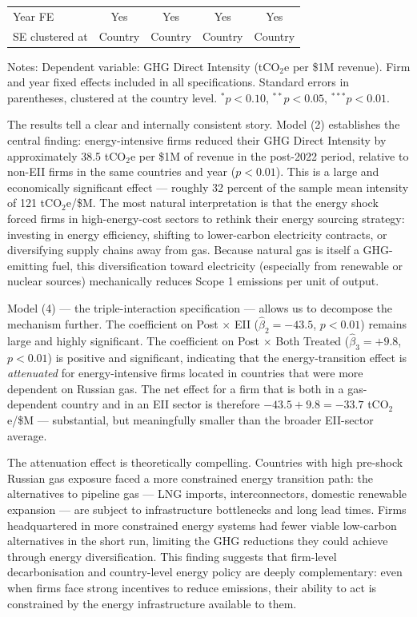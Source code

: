 \documentclass[12pt,a4paper]{article}
\begin{document}
\begin{table}[H]
\begin{tabular}{lcccc}
Year FE        & Yes     & Yes     & Yes     & Yes \\
SE clustered at & Country & Country & Country & Country \\
\bottomrule
\end{tabular}
\begin{tablenotes}
\small
\item Notes: Dependent variable: GHG Direct Intensity (tCO$_2$e per \$1M revenue). Firm and year fixed effects included in all specifications. Standard errors in parentheses, clustered at the country level. $^{*}p<0.10$, $^{**}p<0.05$, $^{***}p<0.01$.
\end{tablenotes}
\end{table}

The results tell a clear and internally consistent story. Model (2) establishes the central finding: energy-intensive firms reduced their GHG Direct Intensity by approximately 38.5 tCO$_2$e per \$1M of revenue in the post-2022 period, relative to non-EII firms in the same countries and year ($p < 0.01$). This is a large and economically significant effect — roughly 32 percent of the sample mean intensity of 121 tCO$_2$e/\$M. The most natural interpretation is that the energy shock forced firms in high-energy-cost sectors to rethink their energy sourcing strategy: investing in energy efficiency, shifting to lower-carbon electricity contracts, or diversifying supply chains away from gas. Because natural gas is itself a GHG-emitting fuel, this diversification toward electricity (especially from renewable or nuclear sources) mechanically reduces Scope 1 emissions per unit of output.

Model (4) — the triple-interaction specification — allows us to decompose the mechanism further. The coefficient on Post $\times$ EII ($\hat\beta_2 = -43.5$, $p<0.01$) remains large and highly significant. The coefficient on Post $\times$ Both Treated ($\hat\beta_3 = +9.8$, $p<0.01$) is positive and significant, indicating that the energy-transition effect is \textit{attenuated} for energy-intensive firms located in countries that were more dependent on Russian gas. The net effect for a firm that is both in a gas-dependent country and in an EII sector is therefore $-43.5 + 9.8 = -33.7$ tCO$_2$e/\$M — substantial, but meaningfully smaller than the broader EII-sector average.

The attenuation effect is theoretically compelling. Countries with high pre-shock Russian gas exposure faced a more constrained energy transition path: the alternatives to pipeline gas — LNG imports, interconnectors, domestic renewable expansion — are subject to infrastructure bottlenecks and long lead times. Firms headquartered in more constrained energy systems had fewer viable low-carbon alternatives in the short run, limiting the GHG reductions they could achieve through energy diversification. This finding suggests that firm-level decarbonisation and country-level energy policy are deeply complementary: even when firms face strong incentives to reduce emissions, their ability to act is constrained by the energy infrastructure available to them.
\end{document}
